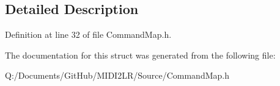 \subsection{Detailed Description}


Definition at line 32 of file Command\+Map.\+h.



The documentation for this struct was generated from the following file\+:\begin{DoxyCompactItemize}
\item 
Q\+:/\+Documents/\+Git\+Hub/\+M\+I\+D\+I2\+L\+R/\+Source/Command\+Map.\+h\end{DoxyCompactItemize}
